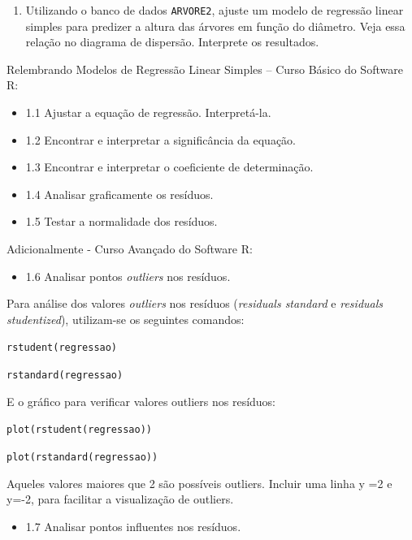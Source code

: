 \documentclass[12pt,brazil,oneside]{book}
\providecommand{\tightlist}{%
  \setlength{\itemsep}{0pt}\setlength{\parskip}{0pt}}
\begin{document}
\begin{enumerate}
\def\labelenumi{\arabic{enumi})}
\tightlist
\item
  Utilizando o banco de dados \texttt{ARVORE2}, ajuste um modelo de regressão linear simples para predizer a altura das árvores
  em função do diâmetro. Veja essa relação no diagrama de dispersão. Interprete os resultados.
\end{enumerate}

Relembrando Modelos de Regressão Linear Simples -- Curso Básico do Software R:

\begin{itemize}
\tightlist
\item
  1.1 Ajustar a equação de regressão. Interpretá-la.
\item
  1.2 Encontrar e interpretar a significância da equação.
\item
  1.3 Encontrar e interpretar o coeficiente de determinação.
\item
  1.4 Analisar graficamente os resíduos.
\item
  1.5 Testar a normalidade dos resíduos.
\end{itemize}

Adicionalmente - Curso Avançado do Software R:

\begin{itemize}
\tightlist
\item
  1.6 Analisar pontos \emph{outliers} nos resíduos.
\end{itemize}

Para análise dos valores \emph{outliers} nos resíduos (\emph{residuals standard} e \emph{residuals studentized}), utilizam-se os seguintes comandos:

\texttt{rstudent(regressao)}

\texttt{rstandard(regressao)}

E o gráfico para verificar valores outliers nos resíduos:

\texttt{plot(rstudent(regressao))}

\texttt{plot(rstandard(regressao))}

Aqueles valores maiores que \textbar{}2\textbar{} são possíveis outliers. Incluir uma linha y =2 e y=-2, para facilitar a visualização de outliers.

\begin{itemize}
\tightlist
\item
  1.7 Analisar pontos influentes nos resíduos.
\end{itemize}
\end{document}
